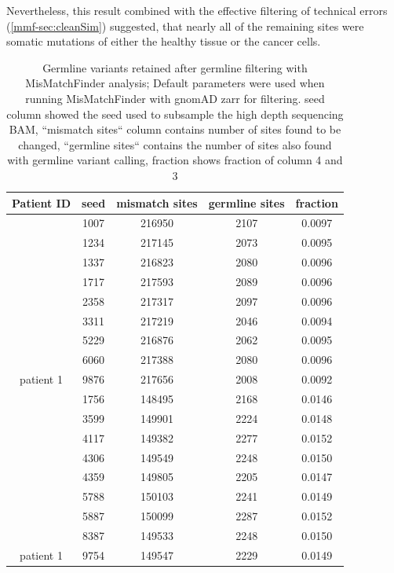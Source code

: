 Nevertheless, this result combined with the effective filtering of technical errors (\autoref{mmf-sec:cleanSim}) suggested, that nearly all of the remaining sites were somatic mutations of either the healthy tissue or the cancer cells.

\begin{table}
\caption[Germline variants retained after germline filtering]{Germline variants retained after germline filtering with MisMatchFinder analysis; Default parameters were used when running MisMatchFinder with gnomAD zarr for filtering. seed column showed the seed used to subsample the high depth sequencing BAM, ``mismatch sites`` column contains number of sites found to be changed, ``germline sites`` contains the number of sites also found with germline variant calling, fraction shows fraction of column 4 and 3}\label{tab:mmf-germlineArtifacts}
\centering
\begin{tabular}{|c|c|c|c|c|}
\toprule
\hline
\textbf{Patient ID} & \textbf{seed} & \textbf{mismatch sites} & \textbf{germline sites} & \textbf{fraction} \\
\hline
 & \num{1007} & \num{216950} &  \num{2107} & \num{0.0097}\\ 
 & \num{1234} & \num{217145} &  \num{2073} & \num{0.0095}\\ 
 & \num{1337} & \num{216823} &  \num{2080} & \num{0.0096}\\ 
 & \num{1717} & \num{217593} &  \num{2089} & \num{0.0096}\\ 
 & \num{2358} & \num{217317} &  \num{2097} & \num{0.0096}\\ 
 & \num{3311} & \num{217219} &  \num{2046} & \num{0.0094}\\ 
 & \num{5229} & \num{216876} &  \num{2062} & \num{0.0095}\\ 
 & \num{6060} & \num{217388} &  \num{2080} & \num{0.0096}\\ 
\multirow{-9}{*}{patient 1} & \num{9876} & \num{217656} &  \num{2008} & \num{0.0092}\\ 
\hline
 & \num{1756} & \num{148495} &  \num{2168} & \num{0.0146}\\ 
 & \num{3599} & \num{149901} &  \num{2224} & \num{0.0148}\\ 
 & \num{4117} & \num{149382} &  \num{2277} & \num{0.0152}\\ 
 & \num{4306} & \num{149549} &  \num{2248} & \num{0.0150}\\ 
 & \num{4359} & \num{149805} &  \num{2205} & \num{0.0147}\\ 
 & \num{5788} & \num{150103} &  \num{2241} & \num{0.0149}\\ 
 & \num{5887} & \num{150099} &  \num{2287} & \num{0.0152}\\ 
 & \num{8387} & \num{149533} &  \num{2248} & \num{0.0150}\\ 
\multirow{-9}{*}{patient 1} & \num{9754} & \num{149547} &  \num{2229} & \num{0.0149}\\
\hline
\bottomrule
\end{tabular}
\end{table}


